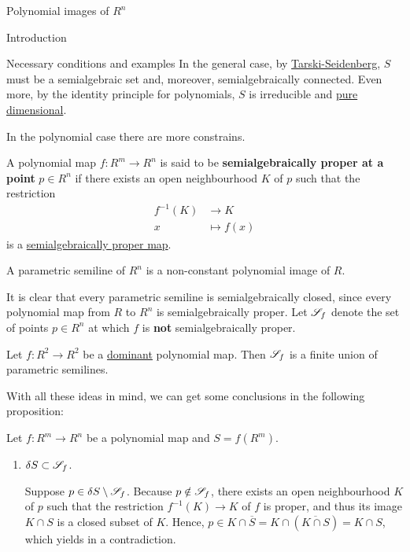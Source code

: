 \documentclass[11pt, a4paper, english, twoside, notitlepage]{report}
\begin{document}
\begin{chapter}{Polynomial images of $R^n$}
\begin{section}{Introduction}
\begin{subsection}{Necessary conditions and examples}
	In the general case, by \hyperref[tarskiSeidenberg]{Tarski-Seidenberg}, $S$ must be a semialgebraic set and, moreover, semialgebraically connected. Even more, by the identity principle for polynomials, $S$ is irreducible and \hyperref[pureDim]{pure dimensional}.
	
	
	In the polynomial case there are more constrains.
	
	\begin{definition}
		A polynomial map $f: R^m \longrightarrow R^n$ is said to be \textbf{semialgebraically proper at a point} $p \in R^n$ if there exists an open neighbourhood $K$ of $p$ such that the restriction 
		\begin{align*}
			f^{-1}(K) & \longrightarrow K\\
			x & \longmapsto f(x)
		\end{align*}
		is a \hyperref[properMap]{semialgebraically proper map}.
	\end{definition}
	
	\begin{definition}
		
		A parametric semiline  of $R^n$ is a non-constant polynomial image of $R$.
		
	\end{definition}
	
	It is clear that every parametric semiline is semialgebraically closed, since every polynomial map from $R$ to $R^n$ is semialgebraically proper. Let $\S_f$ denote the set of points $p \in R^n$ at which $f$ is \textbf{not} semialgebraically proper.
	
	\begin{theorem}[Jelonek]\label{jelonek}
		
		Let $f: R^2 \longrightarrow R^2$ be a \hyperref[dominant]{dominant} polynomial map. Then $\S_f$ is a finite union of parametric semilines.
		
	\end{theorem}
	
	With all these ideas in mind, we can get some conclusions in the following proposition:
	
	\begin{proposition}\label{propIntro}
			
	Let $f: R^m \longrightarrow R^n$ be a polynomial map and $S = f(R^m)$.
		\begin{enumerate}[(1)]
			\item $\delta S \subset \S_f$.
				\begin{Proof}
					Suppose $p \in \delta S \setminus \S_f$. Because $p \notin \S_f$, there exists an open neighbourhood $K$ of $p$ such that the restriction $f^{-1}(K) \rightarrow K$ of $f$ is proper, and thus its image $K \cap S$ is a closed subset of $K$. Hence, $p \in K\cap \overline{S} = K \cap (\overline{K\cap S}) = K \cap S$, which yields in a contradiction.
				\end{Proof}
			

\end{enumerate}
\end{proposition}
\end{subsection}
\end{section}
\end{chapter}
\end{document}
